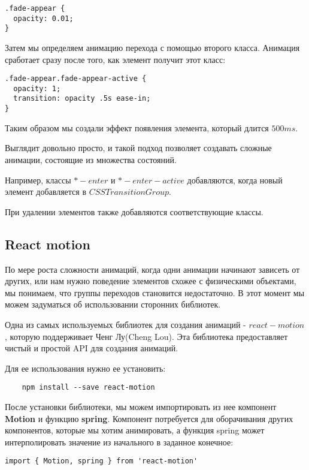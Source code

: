 \begin{lstlisting}
.fade-appear {
  opacity: 0.01;
}
\end{lstlisting}

Затем мы определяем анимацию перехода с помощью второго класса. Анимация сработает сразу после того, как элемент получит этот класс:

\begin{lstlisting}
.fade-appear.fade-appear-active {
  opacity: 1;
  transition: opacity .5s ease-in;
}
\end{lstlisting}

Таким образом мы создали эффект появления элемента, который длится $500ms$.

Выглядит довольно просто, и такой подход позволяет создавать сложные анимации, состоящие из множества состояний.

Например, классы $*-enter$ и $*-enter-active$ добавляются, когда новый элемент добавляется в $CSSTransitionGroup$.

При удалении элементов также добавляются соответствующие классы.

\subsection{React motion}

По мере роста сложности анимаций, когда одни анимации начинают зависеть от других, или нам нужно поведение элементов схожее с физическими объектами, мы понимаем, что группы переходов становится недостаточно. В этот момент мы можем задуматься об использовании сторонних библиотек.

Одна из самых используемых библиотек для создания анимаций - $react-motion$, которую поддерживает Ченг Лу(Cheng Lou). Эта библиотека предоставляет чистый и простой API для создания анимаций.

Для ее использования нужно ее установить:

\begin{lstlisting}
	npm install --save react-motion
\end{lstlisting}

После установки библиотеки, мы можем импортировать из нее компонент \textbf{Motion} и функцию \textbf{spring}. Компонент потребуется для оборачивания других компонентов, которые мы хотим анимировать, а функция spring может интерполировать значение из начального в заданное конечное:

\begin{lstlisting}
import { Motion, spring } from 'react-motion'
\end{lstlisting}

